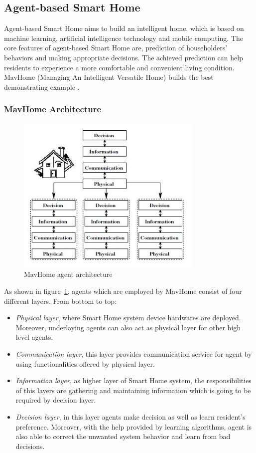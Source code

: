 \subsection{Agent-based Smart Home} \label{secAgent}
Agent-based Smart Home aims to build an intelligent home, which is based on machine learning, artificial intelligence technology and mobile computing. The core features of agent-based Smart Home are, prediction of householders' behaviors and making appropriate decisions. The achieved prediction can help residents to experience a more comfortable and convenient living condition. MavHome (Managing An Intelligent Versatile Home) builds the best demonstrating example \cite{smart_home_agent} . 

\subsubsection{MavHome Architecture}
 \begin{figure}[!htbp]
	\centering
	\includegraphics[width=0.8\textwidth]{smart-home-agent.jpg}
		\caption{MavHome agent architecture \cite{smart_home_agent}}
	\label{fig:smart-home-agent}
\end{figure}
As shown in figure~\ref{fig:smart-home-agent}, agents which are employed by MavHome consist of four different layers. From bottom to top:
\begin{itemize}
\item \emph{Physical layer}, where Smart Home system device hardwares are deployed. Moreover, underlaying agents can also act as physical layer for other high level agents.
\item \emph{Communication layer}, this layer provides communication service for agent by using functionalities offered by physical layer.
\item \emph{Information layer}, as higher layer of Smart Home system,  the responsibilities of this layers are gathering and maintaining information which is going to be required by decision layer.
\item \emph{Decision layer}, in this layer agents make decision as well as learn resident's preference. Moreover, with the help provided by learning algorithms, agent is also able to correct the unwanted system behavior and learn from bad decisions.
\end{itemize}
